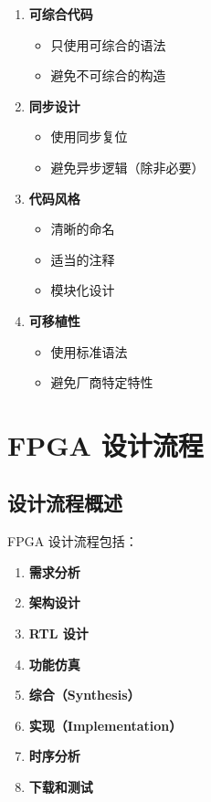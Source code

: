 \begin{enumerate}
  \item \textbf{可综合代码}
    \begin{itemize}
      \item 只使用可综合的语法
      \item 避免不可综合的构造
    \end{itemize}

  \item \textbf{同步设计}
    \begin{itemize}
      \item 使用同步复位
      \item 避免异步逻辑（除非必要）
    \end{itemize}

  \item \textbf{代码风格}
    \begin{itemize}
      \item 清晰的命名
      \item 适当的注释
      \item 模块化设计
    \end{itemize}

  \item \textbf{可移植性}
    \begin{itemize}
      \item 使用标准语法
      \item 避免厂商特定特性
    \end{itemize}
\end{enumerate}

\section{FPGA 设计流程}

\subsection{设计流程概述}

FPGA 设计流程包括：

\begin{enumerate}
  \item \textbf{需求分析}
  \item \textbf{架构设计}
  \item \textbf{RTL 设计}
  \item \textbf{功能仿真}
  \item \textbf{综合（Synthesis）}
  \item \textbf{实现（Implementation）}
  \item \textbf{时序分析}
  \item \textbf{下载和测试}
\end{enumerate}

